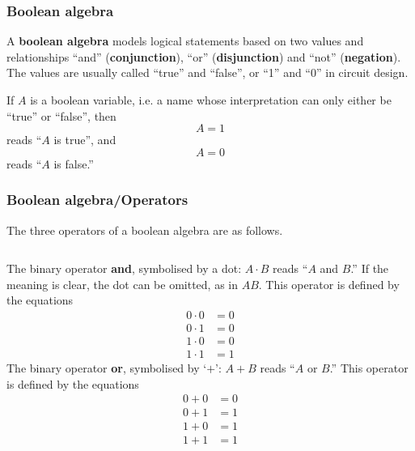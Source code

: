 
% 
\begin{frame}
\frametitle{Boolean algebra}

A \textbf{boolean algebra} models logical statements based on two
values and relationships ``and'' (\textbf{conjunction}), ``or''
(\textbf{disjunction}) and ``not'' (\textbf{nega\-tion}). The values are
usually called ``true'' and ``false'', or ``1'' and ``0'' in circuit
design.

If \(A\) is a boolean variable, i.e. a name whose interpretation can
only either be ``true'' or ``false'', then
\[
A = 1
\]
reads ``\(A\) is true'', and
\[
A = 0
\]
reads ``\(A\) is false.''

\end{frame}

% 
\begin{frame}
\frametitle{Boolean algebra/Operators}
\label{def_and_or}

The three operators of a boolean algebra are as follows.

\bigskip

\begin{columns}
    The binary operator \textbf{and}, symbolised by a dot: \(A \cdot
    B\) reads ``\(A\) and \(B\).'' If the meaning is clear, the dot
    can be omitted, as in \(AB\). This operator is defined by the
    equations
    \begin{align*}
      0 \cdot 0 &= 0\\
      0 \cdot 1 &= 0\\
      1 \cdot 0 &= 0\\
      1 \cdot 1 &= 1
    \end{align*}
    The binary operator \textbf{or}, symbolised by `\(+\)': \(A+B\)
    reads ``\(A\) or \(B\).'' This operator is defined by the
    equations
    \begin{align*}
      0 + 0 &= 0\\
      0 + 1 &= 1\\
      1 + 0 &= 1\\
      1 + 1 &= 1
    \end{align*}
\end{columns}

\end{frame}

